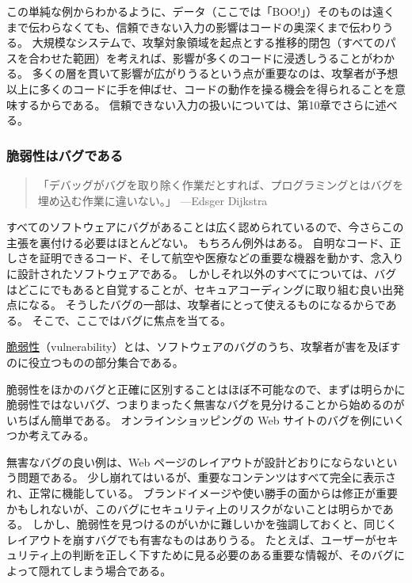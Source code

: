 \documentclass[uplatex]{jsarticle}
\def\label#1{}%
\begin{document}
この単純な例からわかるように、データ（ここでは「BOO!」）そのものは遠くまで伝わらなくても、信頼できない入力の影響はコードの奥深くまで伝わりうる。
大規模なシステムで、攻撃対象領域を起点とする推移的閉包（すべてのパスを合わせた範囲）を考えれば、影響が多くのコードに浸透しうることがわかる。
多くの層を貫いて影響が広がりうるという点が重要なのは、攻撃者が予想以上に多くのコードに手を伸ばせ、コードの動作を操る機会を得られることを意味するからである。
信頼できない入力の扱いについては、第10章でさらに述べる。

\subsubsection{脆弱性はバグである}

\begin{quote}
「デバッグがバグを取り除く作業だとすれば、プログラミングとはバグを埋め込む作業に違いない。」 ---Edsger Dijkstra
\end{quote}

すべてのソフトウェアにバグがあることは広く認められているので、今さらこの主張を裏付ける必要はほとんどない。
もちろん例外はある。
自明なコード、正しさを証明できるコード、そして航空や医療などの重要な機器を動かす、念入りに設計されたソフトウェアである。
しかしそれ以外のすべてについては、バグはどこにでもあると自覚することが、セキュアコーディングに取り組む良い出発点になる。
そうしたバグの一部は、攻撃者にとって使えるものになるからである。
そこで、ここではバグに焦点を当てる。

\begin{dfn}[脆弱性]\label{dfn:ch8-vulnerability}
\underline{脆弱性}（vulnerability）とは、ソフトウェアのバグのうち、攻撃者が害を及ぼすのに役立つものの部分集合である。
\end{dfn}

脆弱性をほかのバグと正確に区別することはほぼ不可能なので、まずは明らかに脆弱性ではないバグ、つまりまったく無害なバグを見分けることから始めるのがいちばん簡単である。
オンラインショッピングの Web サイトのバグを例にいくつか考えてみる。

\begin{exa}[無害なバグと有害になりうる類似のバグ]\label{exa:ch8-harmless-bug}
無害なバグの良い例は、Web ページのレイアウトが設計どおりにならないという問題である。
少し崩れてはいるが、重要なコンテンツはすべて完全に表示され、正常に機能している。
ブランドイメージや使い勝手の面からは修正が重要かもしれないが、このバグにセキュリティ上のリスクがないことは明らかである。
しかし、脆弱性を見つけるのがいかに難しいかを強調しておくと、同じくレイアウトを崩すバグでも有害なものはありうる。
たとえば、ユーザーがセキュリティ上の判断を正しく下すために見る必要のある重要な情報が、そのバグによって隠れてしまう場合である。
\end{exa}
\end{document}
